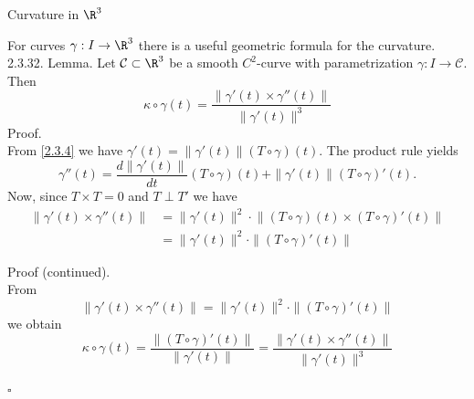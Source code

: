 \documentclass[smaller,hyperref={CJKbookmarks=true}]{beamer}
\begin{document}
\begin{frame}{Curvature in $\R^3$}
\begin{spacing}{1}
For curves $\gamma:I\to\R^3$ there is a useful geometric formula for the curvature.\\[5pt]
\alert{2.3.32. Lemma.} Let $\mathcal{C}\subset\R^3$ be a smooth $C^2$-curve with parametrization $\gamma:I\to\mathcal{C}$. Then
\begin{equation}\label{2.3.11}
  \kappa\circ\gamma(t)=\frac{\|\gamma'(t)\times\gamma''(t)\|}{\|\gamma'(t)\|^3}
\end{equation}
\alert{Proof.}\\
From \eqref{2.3.4} we have $\gamma'(t)=\|\gamma'(t)\|(T\circ\gamma)(t)$. The product rule yields
\[\gamma''(t)=\frac{d\|\gamma'(t)\|}{dt}(T\circ\gamma)(t)
+\|\gamma'(t)\|(T\circ\gamma)'(t).\]
Now, since $T\times T=0$ and $T\perp T'$ we have
\begin{equation}\label{2.3.12}
  \begin{split}
     \|\gamma'(t)\times\gamma''(t)\| &=\|\gamma'(t)\|^2\cdot\left\|(T\circ\gamma)(t)\times
     (T\circ\gamma)'(t)\right\| \\
       &=\|\gamma'(t)\|^2\cdot\|(T\circ\gamma)'(t)\|
  \end{split}
\end{equation}
\end{spacing}
\newpage
\begin{spacing}{1.2}
\alert{Proof (continued).}\\
From
\[\|\gamma'(t)\times\gamma''(t)\|=\|\gamma'(t)\|^2\cdot
\|(T\circ\gamma)'(t)\|\]
we obtain
\[\kappa\circ\gamma(t)=\frac{\|(T\circ\gamma)'(t)\|}{\|\gamma'(t)\|}
=\frac{\|\gamma'(t)\times\gamma''(t)\|}{\|\gamma'(t)\|^3}\]
\begin{flushright}
  $\square$
\end{flushright}
\end{spacing}
\end{frame}
\end{document}
